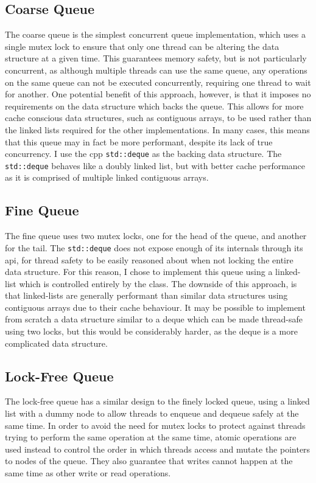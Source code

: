 \documentclass{article}
\begin{document}
\subsection{Coarse Queue}
The coarse queue is the simplest concurrent queue implementation, which uses a
single mutex lock to ensure that only one thread can be altering the data
structure at a given time. This guarantees memory safety, but is not
particularly concurrent, as although multiple threads can use the same queue,
any operations on the same queue can not be executed concurrently, requiring one
thread to wait for another. One potential benefit of this approach, however, is
that it imposes no requirements on the data structure which backs the queue.
This allows for more cache conscious data structures, such as contiguous arrays,
to be used rather than the linked lists required for the other implementations.
In many cases, this means that this queue may in fact be more performant,
despite its lack of true concurrency. I use the cpp \verb|std::deque| as the
backing data structure. The \verb|std::deque| behaves like a doubly linked list,
but with better cache performance as it is comprised of multiple linked
contiguous arrays.

\subsection{Fine Queue}
The fine queue uses two mutex locks, one for the head of the queue, and another
for the tail. The \verb|std::deque| does not expose enough of its internals
through its api, for thread safety to be easily reasoned about when not locking
the entire data structure. For this reason, I chose to implement this queue
using a linked-list which is controlled entirely by the class. The downside of
this approach, is that linked-lists are generally performant than similar data
structures using contiguous arrays due to their cache behaviour. It may be
possible to implement from scratch a data structure similar to a deque which can
be made thread-safe using two locks, but this would be considerably harder, as
the deque is a more complicated data structure.

\subsection{Lock-Free Queue}
The lock-free queue has a similar design to the finely locked queue, using a
linked list with a dummy node to allow threads to enqueue and dequeue safely at
the same time. In order to avoid the need for mutex locks to protect against
threads trying to perform the same operation at the same time, atomic operations
are used instead to control the order in which threads access and mutate the
pointers to nodes of the queue. They also guarantee that writes cannot happen at
the same time as other write or read operations.
\end{document}
